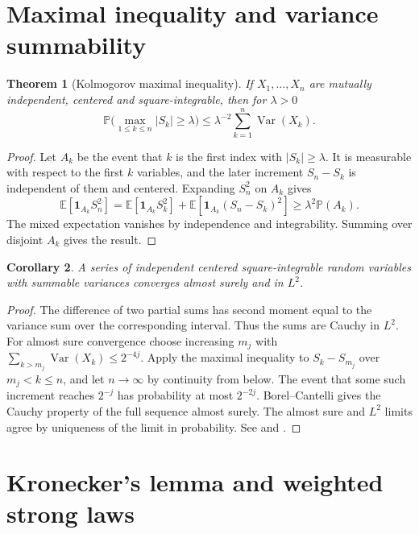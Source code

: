 \documentclass[11pt,oneside,openany]{book}
\newcommand{\Prob}{\mathbb{P}}
\newcommand{\E}{\mathbb{E}}
\DeclareMathOperator{\Var}{Var}
\newcommand{\ind}{\mathbf{1}}
\theoremstyle{plain}
\newtheorem{theorem}{Theorem}[chapter]
\newtheorem{corollary}[theorem]{Corollary}
\theoremstyle{definition}
\theoremstyle{remark}
\begin{document}
\section{Maximal inequality and variance summability}
\label{p08-03}

\begin{theorem}[Kolmogorov maximal inequality]\label{thm:kolm-max}
If \(X_1,\ldots,X_n\) are mutually independent, centered and
square-integrable, then for \(\lambda>0\)
\[
 \Prob\big(\max_{1\le k\le n}|S_k|\ge\lambda\big)
 \le\lambda^{-2}\sum_{k=1}^n\Var(X_k).
\]
\end{theorem}
\begin{proof}
Let \(A_k\) be the event that \(k\) is the first index with
\(|S_k|\ge\lambda\). It is measurable with respect to the first \(k\)
variables, and the later increment \(S_n-S_k\) is independent of them
and centered. Expanding \(S_n^2\) on \(A_k\) gives
\[
 \E[\ind_{A_k}S_n^2]
 = \E[\ind_{A_k}S_k^2]
   + \E[\ind_{A_k}(S_n-S_k)^2]
 \ge\lambda^2\Prob(A_k).
\]
The mixed expectation vanishes by independence and integrability.
Summing over disjoint \(A_k\) gives the result.
\end{proof}

\begin{corollary}\label{cor:series-variance}
A series of independent centered square-integrable random variables
with summable variances converges almost surely and in \(L^2\).
\end{corollary}
\begin{proof}
The difference of two partial sums has second moment equal to the
variance sum over the corresponding interval. Thus the sums are
Cauchy in \(L^2\). For almost sure convergence choose increasing
\(m_j\) with \(\sum_{k>m_j}\Var(X_k)\le 2^{-4j}\).
Apply the maximal inequality to \(S_k-S_{m_j}\) over
\(m_j<k\le n\), and let \(n\to\infty\) by continuity from below.
The event that some such increment reaches \(2^{-j}\) has
probability at most \(2^{-2j}\). Borel--Cantelli gives the Cauchy
property of the full sequence almost surely. The almost sure and
\(L^2\) limits agree by uniqueness of the limit in probability.
See \cite[Section 2.5]{Durrett} and
\cite[Lemmas 5.15 and 5.16, pp.~109--110]{Kallenberg}.
\end{proof}

\section{Kronecker's lemma and weighted strong laws}
\label{p08-04}
\end{document}
